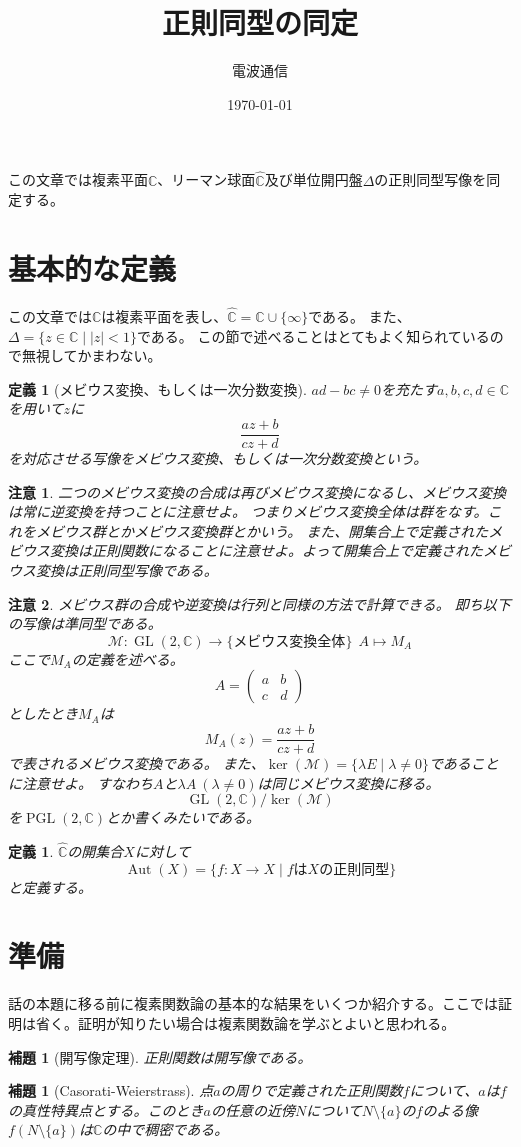 \documentclass[leqno]{jsarticle}
\title{正則同型の同定}
\author{電波通信}
\date{\today}
\newtheorem{lem}[thm]{補題}
\newtheorem{df}[thm]{定義}
\newtheorem*{cau}{注意}
\newcommand{\cc}{\mathbb{C}}
\DeclareMathOperator{\aut}{Aut}
\DeclareMathOperator{\gl}{GL}
\DeclareMathOperator{\pgl}{PGL}
\begin{document}
\maketitle
この文章では複素平面$\cc$、リーマン球面$\hat{\cc}$及び単位開円盤$\Delta$の正則同型写像を同定する。
\section{基本的な定義}
この文章では$\cc$は複素平面を表し、$\hat{\cc}=\cc\cup \{\infty\}$である。
また、$\Delta=\{z\in \cc\mid |z|<1\}$である。
この節で述べることはとてもよく知られているので無視してかまわない。
\begin{df}[メビウス変換、もしくは一次分数変換]
$ad-bc\neq 0$を充たす$a,b,c,d\in \cc$を用いて$z$に
\[
\frac{az+b}{cz+d}
\]
を対応させる写像をメビウス変換、もしくは一次分数変換という。
\end{df}

\begin{cau}
二つのメビウス変換の合成は再びメビウス変換になるし、メビウス変換は常に逆変換を持つことに注意せよ。
つまりメビウス変換全体は群をなす。これをメビウス群とかメビウス変換群とかいう。
また、開集合上で定義されたメビウス変換は正則関数になることに注意せよ。よって開集合上で定義されたメビウス変換は正則同型写像である。
\end{cau}

\begin{cau}
メビウス群の合成や逆変換は行列と同様の方法で計算できる。
即ち以下の写像は準同型である。
\[
\mathcal{M}:\gl(2,\cc)\to \{\text{メビウス変換全体}\}\ \ A\mapsto M_A
\]
ここで$M_A$の定義を述べる。
\begin{equation*}
A=
\begin{pmatrix}
a & b\\
c & d
\end{pmatrix}
\end{equation*}
としたとき$M_A$は
\[
M_A(z)=\frac{az+b}{cz+d}
\]
で表されるメビウス変換である。
また、$\ker(\mathcal{M})=\{\lambda E\mid \lambda\neq 0\}$であることに注意せよ。
すなわち$A$と$\lambda A\ (\lambda\neq0)$は同じメビウス変換に移る。
\[
\gl (2,\cc)/\ker(\mathcal{M})
\]
を$\pgl(2,\cc)$とか書くみたいである。
\end{cau}
\begin{df}
$\hat{\cc}$の開集合$X$に対して
\[
\aut(X)=\{f:X\to X\mid \text{$f$は$X$の正則同型}\}
\]
と定義する。
\end{df}
\section{準備}
話の本題に移る前に複素関数論の基本的な結果をいくつか紹介する。ここでは証明は省く。証明が知りたい場合は複素関数論を学ぶとよいと思われる。
\begin{lem}[開写像定理]
正則関数は開写像である。
\end{lem}
\begin{lem}[Casorati-Weierstrass]\label{CW}
点$a$の周りで定義された正則関数$f$について、$a$は$f$の真性特異点とする。このとき$a$の任意の近傍$N$について$N\setminus \{a\}$の$f$のよる像$f(N\setminus \{a\})$は$\cc$の中で稠密である。
\end{lem}
\end{document}
